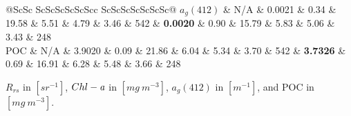 \documentclass[preview]{standalone}
\begin{document}
\begin{threeparttable}
\begin{tabular}{@{\extracolsep{4pt}}ScSc ScScScScScScc ScScScScScScSc@{}}
$a_{g}(412)$ 	&		N/A				&  0.0021             	& 0.34 	&  19.58  	&  5.51 &  4.79 &  3.46 & 542  	& \textbf{ 0.0020            } 	& 0.90 	&  15.79    &    5.83 	&	 5.06 	&   3.43 	& 	248 	\\
POC 			&		N/A				&  3.9020             	& 0.09 	&  21.86  	&  6.04 &  5.34 &  3.70 & 542  	& \textbf{ 3.7326            } 	& 0.69 	&  16.91    &    6.28 	&	 5.48 	&   3.66 	& 	248 	\\ \hline
 \end{tabular}
\begin{tablenotes}\footnotesize
\item [*] $R_{rs}$ in $[sr^{-1}]$, $Chl-\it{a}$ in $[mg~m^{-3}]$, $a_{g}(412)$ in $[m^{-1}]$, and POC in $[mg~m^{-3}]$.
\end{tablenotes}
\end{threeparttable} 
\end{document}
